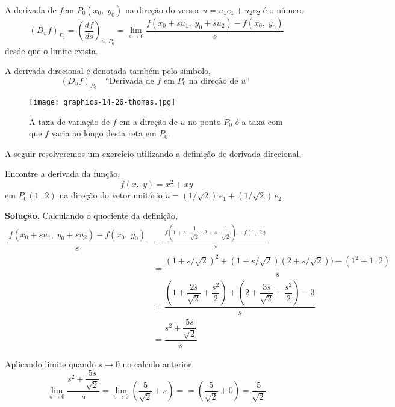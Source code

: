 \begin{defi}
	A derivada de \(f\)em \(P_{0}(x_{0},\; y_{0})\) na direção do versor \(u = u_{1}e_{1} + u_{2}e_{2}\) é o número
	\begin{equation*}
		(D_{u}f)_{P_{0}}=\left(\frac{df}{ds}\right)_{u,\, P_{0}}=\lim_{s \to 0}
		\dfrac{f(x_{0}+su_{1}, \; y_{0}+su_{2})-f(x_{0},\; y_{0})}{s}
	\end{equation*}
	desde que o limite exista.
\end{defi}

A derivada direcional é denotada também pelo símbolo,
\begin{equation*}
	\left(D_{u}f \right)_{P_{0}} \quad \text{``Derivada de \(f\) em \(P_{0}\) na direção de \(u\)'' }
\end{equation*}

\begin{figure}[!h]
	\centering
	\texttt{[image: graphics-14-26-thomas.jpg]}
	\caption{A taxa de variação de \(f\) em a direção de \(u\) no ponto \(P_{0}\) é a taxa com que \(f\) varia ao longo desta reta em \(P_{0}\).}
	\label{fig:14-26-thomas}
\end{figure}

A seguir resolveremos um exercício utilizando a definição de derivada direcional,
\begin{exc}
	Encontre a derivada da função,
	\begin{equation*}
		f(x,\; y)=x^{2}+xy
	\end{equation*}
	em \(P_{0}(1,\; 2)\) na direção do vetor unitário \(u = (1/\sqrt{2})\,e_{1}+(1/\sqrt{2})\,e_{2}\)
\end{exc}

\textbf{Solução.}
Calculando o quociente da definição,
\begin{align*}
	\dfrac{f(x_{0}+su_{1}, \; y_{0}+su_{2})-f(x_{0},\; y_{0})}{s} &= \frac{f\left(1+s\cdot \dfrac{1}{\sqrt{2}},\;
		2+s\cdot \dfrac{1}{\sqrt{2}} \right)-f(1,\; 2)}{s} \\
	&=\dfrac{(1+s/\sqrt{2})^{2}+(1+s/\sqrt{2})(2+s/\sqrt{2}))-(1^{2}+1\cdot 2)}{s}\\
	&=\dfrac{\left(1+\dfrac{2s}{\sqrt{2}}+\dfrac{s^{2}}{2}\right)+\left(2+\dfrac{3s}{\sqrt{2}}+\dfrac{s^{2}}{2}\right)-3}{s}\\
	&=\dfrac{s^{2}+\dfrac{5s}{\sqrt{2}}}{s}
\end{align*}

Aplicando limite quando \(s \to 0\) no calculo anterior
\begin{equation*}
	\lim_{s \to 0} \dfrac{s^{2}+\dfrac{5s}{\sqrt{2}}}{s}=\lim_{s \to 0}\left(\dfrac{5}{\sqrt{2}}+s \right)=
	=\left(\frac{5}{\sqrt{2}}+0\right)=\frac{5}{\sqrt{2}}
\end{equation*}

